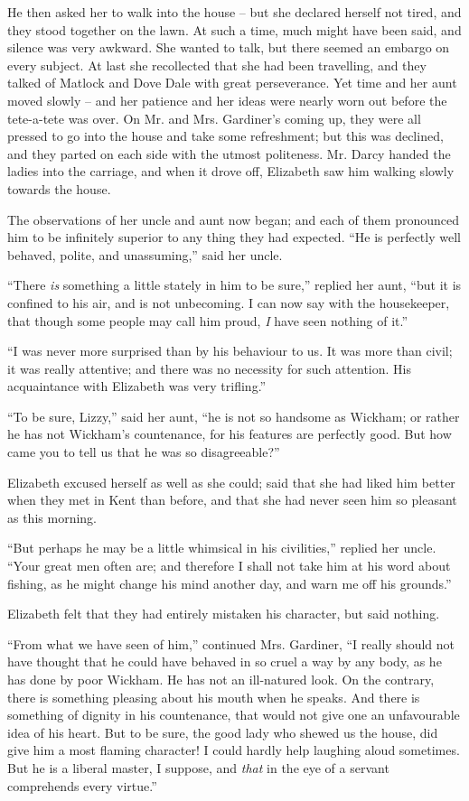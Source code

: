 He then asked her to walk into the house -- but she
declared herself not tired, and they stood together on the
lawn. At such a time, much might have been said, and
silence was very awkward. She wanted to talk, but
there seemed an embargo on every subject. At last she
recollected that she had been travelling, and they talked
of Matlock and Dove Dale with great perseverance. Yet
time and her aunt moved slowly -- and her patience and
her ideas were nearly worn out before the tete-a-tete was
over. On Mr. and Mrs. Gardiner’s coming up, they were
all pressed to go into the house and take some refreshment;
but this was declined, and they parted on each
side with the utmost politeness. Mr. Darcy handed the
ladies into the carriage, and when it drove off, Elizabeth
saw him walking slowly towards the house.

The observations of her uncle and aunt now began; and
each of them pronounced him to be infinitely superior to
any thing they had expected. “He is perfectly well
behaved, polite, and unassuming,” said her uncle.

“There \textit{is} something a little stately in him to be sure,”
replied her aunt, “but it is confined to his air, and is
not unbecoming. I can now say with the housekeeper,
that though some people may call him proud, \textit{I} have seen
nothing of it.”

“I was never more surprised than by his behaviour to
us. It was more than civil; it was really attentive; and
there was no necessity for such attention. His acquaintance
with Elizabeth was very trifling.”

“To be sure, Lizzy,” said her aunt, “he is not so handsome
as Wickham; or rather he has not Wickham’s
countenance, for his features are perfectly good. But how
came you to tell us that he was so disagreeable?”

Elizabeth excused herself as well as she could; said
that she had liked him better when they met in Kent than
before, and that she had never seen him so pleasant as
this morning.

“But perhaps he may be a little whimsical in his
civilities,” replied her uncle. “Your great men often are;
and therefore I shall not take him at his word about
fishing, as he might change his mind another day, and
warn me off his grounds.”

Elizabeth felt that they had entirely mistaken his
character, but said nothing.

“From what we have seen of him,” continued Mrs. Gardiner,
“I really should not have thought that he could
have behaved in so cruel a way by any body, as he has
done by poor Wickham. He has not an ill-natured look.
On the contrary, there is something pleasing about his
mouth when he speaks. And there is something of dignity
in his countenance, that would not give one an unfavourable
idea of his heart. But to be sure, the good lady who
shewed us the house, did give him a most flaming character!
I could hardly help laughing aloud sometimes. But he
is a liberal master, I suppose, and \textit{that} in the eye of a servant
comprehends every virtue.”

